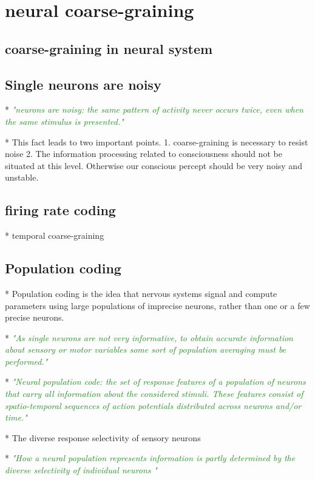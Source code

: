 \documentclass[utf8]{article}
\newcommand{\rewrite}[1]{\textcolor{ForestGreen}{\textit{"#1"}}}
\begin{document}
	\section{neural coarse-graining}
		\subsection{coarse-graining in neural system}
		\subsection{Single neurons are noisy}
			* \rewrite{neurons are noisy: the same pattern of activity never occurs twice, even when the same stimulus is presented.}
		
			* This fact leads to two important points. 
				1. coarse-graining is necessary to resist noise
				2. The information processing related to consciousness should not be situated at 
				this level. Otherwise our conscious percept should be very noisy and unstable.
		
		
		\subsection{firing rate coding}
			* temporal coarse-graining
		
		
		
		\subsection{Population coding}
			* Population coding is the idea that nervous systems signal and compute parameters using
			large populations of imprecise neurons, rather than one or a few precise neurons. 
			
			* \rewrite{As single neurons are not very informative, to obtain accurate information about sensory or motor variables some sort of population averaging must be performed.}
			
			* \rewrite{Neural population code: the set of response features of a population of neurons that carry all information about the considered stimuli. These features consist of spatio-temporal sequences of action potentials distributed across neurons and/or time.}
			
			* The diverse response selectivity of sensory neurons
			
			* \rewrite{How a neural population represents information is partly determined by the diverse selectivity of individual neurons \cite{Shamir2014}}
			
\end{document}

